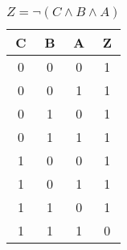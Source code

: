 
\begin{center}
    \begin{table}[h] \caption{\(Z = \lnot (C \land B \land A) \)}
        \begin{center}
            \begin{tabular}{|c|c|c||c|} \hline
            C & B & A & Z \\ \hline\hline
            0 & 0 & 0 & 1 \\ \hline
            0 & 0 & 1 & 1 \\ \hline
            0 & 1 & 0 & 1 \\ \hline
            0 & 1 & 1 & 1 \\ \hline
            1 & 0 & 0 & 1 \\ \hline
            1 & 0 & 1 & 1 \\ \hline
            1 & 1 & 0 & 1 \\ \hline
            1 & 1 & 1 & 0 \\ \hline
            \end{tabular}
        \end{center}
    \end{table}
\end{center}
